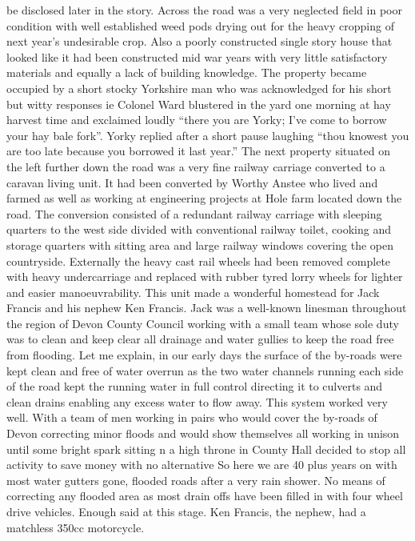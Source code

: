 be disclosed later in the story. Across the road was a very neglected field in
poor condition with well established weed pods drying out for the heavy
cropping of next year's undesirable crop. Also a poorly constructed single
story house that looked like it had been constructed mid war years with very
little satisfactory materials and equally a lack of building knowledge. The
property became occupied by a short stocky Yorkshire man who was acknowledged
for his short but witty responses ie Colonel Ward blustered in the yard one
morning at hay harvest time and exclaimed loudly ``there you are Yorky; I've
come to borrow your hay bale fork''. Yorky replied after a short pause laughing
``thou knowest you are too late because you borrowed it last year.''  The next
property situated on the left further down the road was a very fine railway
carriage converted to a caravan living unit. It had been converted by Worthy
Anstee who lived and farmed as well as working at engineering projects at Hole
farm located down the road. The conversion consisted of a redundant railway
carriage with sleeping quarters to the west side divided with conventional
railway toilet, cooking and storage quarters with sitting area and large
railway windows covering the open countryside. Externally the heavy cast rail
wheels had been removed complete with heavy undercarriage and replaced with
rubber tyred lorry wheels for lighter and easier manoeuvrability. This unit
made a wonderful homestead for Jack Francis and his nephew Ken Francis. Jack
was a well-known linesman throughout the region of Devon County Council working
with a small team whose sole duty was to clean and keep clear all drainage and
water gullies to keep the road free from flooding. Let me explain, in our early
days the surface of the by-roads were kept clean and free of water overrun as
the two water channels running each side of the road kept the running water in
full control directing it to culverts  and clean drains enabling any excess
water to flow away. This system worked very well. With a team of men working in
pairs who would cover the by-roads of Devon correcting minor floods and would
show themselves all working in unison until some bright spark sitting n a high
throne in County Hall decided to stop all activity to save money with no
alternative  So here we are 40 plus years on with most water gutters gone,
flooded roads after a very rain shower. No means of correcting any flooded area
as most drain offs have been filled in with four wheel drive vehicles. Enough
said at this stage. Ken Francis, the nephew, had a matchless 350cc motorcycle.
